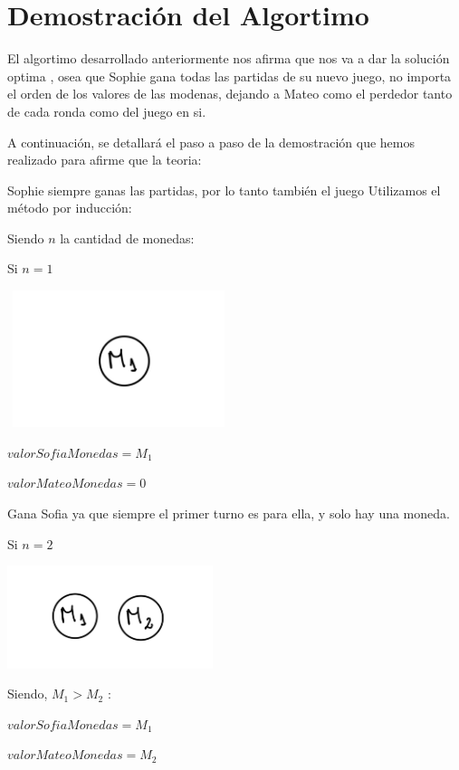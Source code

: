 \section{Demostración del Algortimo}

El algortimo desarrollado anteriormente nos afirma que nos va a dar la solución optima ,
osea que Sophie gana todas las partidas de su nuevo juego, no importa el orden de los valores
de las modenas, dejando a Mateo como el perdedor tanto de cada ronda como del juego en si.

\vskip0.5cm

A continuación, se detallará el paso a paso de la demostración que hemos realizado para afirme que la teoria:

\vskip0.5cm

{\large{Sophie siempre ganas las partidas, por lo tanto también el juego}} 
\vskip0.5cm
Utilizamos el método por inducción:
\vskip0.5cm

Siendo $n$ la cantidad de monedas:
\vskip0.5cm

Si $n=1$ 

\includegraphics[width=6.5cm, height=4cm]{images/IMG_1625.jpg}


$valorSofiaMonedas=M_{1}$

$valorMateoMonedas=0$

Gana Sofia ya que siempre el primer turno es para ella, y solo hay una moneda.

\vskip1cm

Si $n=2$

\includegraphics[width=6cm, height=3cm]{images/IMG_1626.jpg}

Siendo, $M_{1}>M_{2}$ : 


$valorSofiaMonedas=M_{1}$

$valorMateoMonedas=M_{2}$

